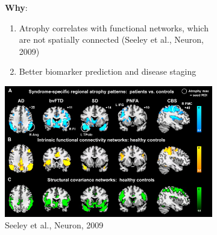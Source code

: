\begin{frame}
\begin{figure}
\begin{subfigure}{0.48\textwidth}
\textbf{Why}:
\begin{enumerate}
\item Atrophy correlates with functional networks, which are not spatially connected (Seeley et al., Neuron, 2009)
\vspace{2em}
\item Better biomarker prediction and disease staging
\end{enumerate}
\end{subfigure}
\begin{subfigure}{0.5\textwidth}
\centering 
\includegraphics[width=\textwidth, right, trim=0 85 0 0, clip]{seeley_connectivity_overlap.jpg}
Seeley et al., Neuron, 2009
\end{subfigure}

\end{figure}

\vfill

\vspace{-3em}


\end{frame}







% 
% 
% 
% 
% 
%   
% 
% 
% 






